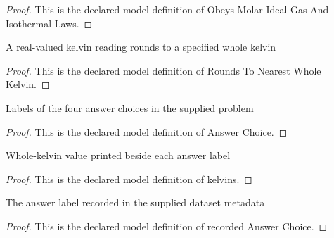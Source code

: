 \begin{proof}
  This is the declared model definition of Obeys Molar Ideal Gas And Isothermal Laws.
\end{proof}
\begin{definition}
  \label{def:physics:phyx-mini-0369:phyxminiproblems-problemphyxmini0369-roundstonearestwholekelvin}
  A real-valued kelvin reading rounds to a specified whole kelvin
\end{definition}
\begin{proof}
  This is the declared model definition of Rounds To Nearest Whole Kelvin.
\end{proof}
\begin{definition}
  \label{def:physics:phyx-mini-0369:phyxminiproblems-problemphyxmini0369-answerchoice}
  Labels of the four answer choices in the supplied problem
\end{definition}
\begin{proof}
  This is the declared model definition of Answer Choice.
\end{proof}
\begin{definition}[kelvins]
  \label{def:physics:phyx-mini-0369:phyxminiproblems-problemphyxmini0369-answerchoice-kelvins}
  Whole-kelvin value printed beside each answer label
\end{definition}
\begin{proof}
  This is the declared model definition of kelvins.
\end{proof}
\begin{definition}
  \label{def:physics:phyx-mini-0369:phyxminiproblems-problemphyxmini0369-recordedanswerchoice}
  The answer label recorded in the supplied dataset metadata
\end{definition}
\begin{proof}
  This is the declared model definition of recorded Answer Choice.
\end{proof}
